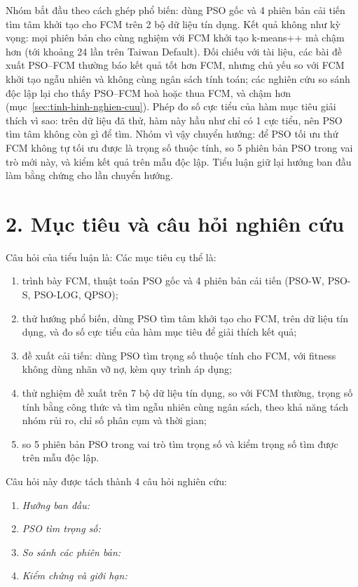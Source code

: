 Nhóm bắt đầu theo cách ghép phổ biến: dùng PSO gốc và 4 phiên bản cải tiến tìm tâm khởi tạo cho FCM trên 2 bộ dữ liệu tín
dụng. Kết quả không như kỳ vọng: mọi phiên bản cho cùng nghiệm với FCM khởi tạo k-means++ mà chậm hơn (tới khoảng 24 lần trên Taiwan Default). Đối chiếu
với tài liệu, các bài đề xuất PSO--FCM thường báo kết quả tốt hơn FCM, nhưng chủ yếu so với FCM khởi tạo ngẫu nhiên và không
cùng ngân sách tính toán; các nghiên cứu so sánh độc lập lại cho thấy PSO--FCM hoà hoặc thua FCM, và chậm hơn
(mục~\ref{sec:tinh-hinh-nghien-cuu}). Phép đo số cực tiểu của hàm mục tiêu giải thích vì sao: trên dữ liệu đã thử, hàm này hầu
như chỉ có 1 cực tiểu, nên PSO tìm tâm không còn gì để tìm. Nhóm vì vậy chuyển hướng: để PSO tối ưu thứ FCM không tự tối ưu
được là trọng số thuộc tính, so 5 phiên bản PSO trong vai trò mới này, và kiểm kết quả trên mẫu độc lập. Tiểu luận giữ
lại hướng ban đầu làm bằng chứng cho lần chuyển hướng.

\section*{2. Mục tiêu và câu hỏi nghiên cứu}

Câu hỏi của tiểu luận là: \emph{\cauHoiTong} Các mục tiêu cụ thể là:
\begin{enumerate}[label=(\alph*), leftmargin=*]
  \item trình bày FCM, thuật toán PSO gốc và 4 phiên bản cải tiến (PSO-W, PSO-S, PSO-LOG, QPSO);
  \item thử hướng phổ biến, dùng PSO tìm tâm khởi tạo cho FCM, trên dữ liệu tín dụng, và đo số cực tiểu của hàm mục tiêu để
  giải thích kết quả;
  \item đề xuất cải tiến: dùng PSO tìm trọng số thuộc tính cho FCM, với fitness không dùng nhãn vỡ nợ, kèm quy trình áp dụng;
  \item thử nghiệm đề xuất trên 7 bộ dữ liệu tín dụng, so với FCM thường, trọng số tính bằng công thức và tìm ngẫu nhiên
  cùng ngân sách, theo khả năng tách nhóm rủi ro, chỉ số phân cụm và thời gian;
  \item so 5 phiên bản PSO trong vai trò tìm trọng số và kiểm trọng số tìm được trên mẫu độc lập.
\end{enumerate}
Câu hỏi này được tách thành 4 câu hỏi nghiên cứu:
\begin{enumerate}[label=\textbf{CH\arabic*.}, leftmargin=*]
  \item \emph{Hướng ban đầu:} \chMot
  \item \emph{PSO tìm trọng số:} \chHai
  \item \emph{So sánh các phiên bản:} \chBa
  \item \emph{Kiểm chứng và giới hạn:} \chBon
\end{enumerate}

